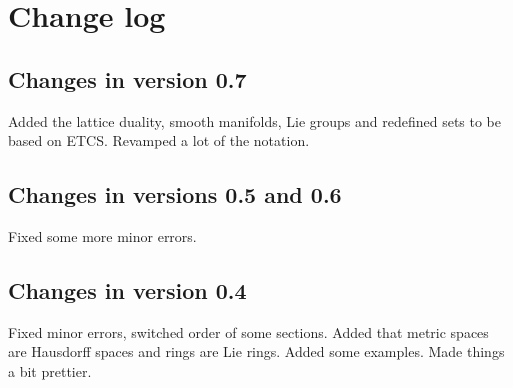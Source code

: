 \chapter*{Change log}
\section*{Changes in version 0.7}
Added the lattice duality, smooth manifolds, Lie groups and redefined sets to be based on ETCS. Revamped a lot of the notation.

\section*{Changes in versions 0.5 and 0.6}
Fixed some more minor errors.

\section*{Changes in version 0.4}
Fixed minor errors, switched order of some sections. Added that metric spaces are Hausdorff spaces and rings are Lie rings. Added some examples. Made things a bit prettier.